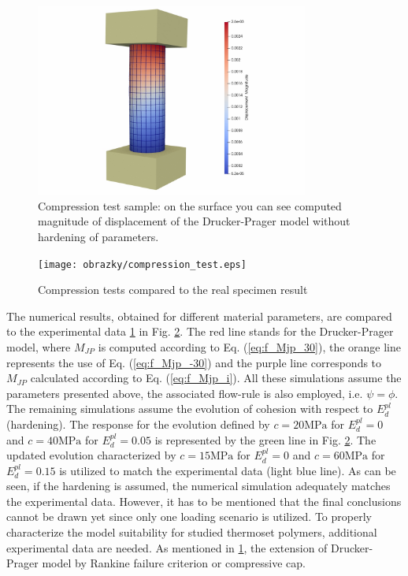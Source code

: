 \begin{figure}[h!]
	\centering
	\includegraphics[width=0.8\textwidth]{obrazky/compression_displacement_magnitude.jpg}
	\caption[Compression test sample]{Compression test sample: on the surface you can see computed magnitude of displacement of the Drucker-Prager model without hardening of parameters.}\label{obr:Compresion_test}
\end{figure}


\begin{figure}[h!]
	\centering
	\texttt{[image: obrazky/compression\_test.eps]}
	\caption[Compresion tests]{Compression tests compared to the real specimen result \cite{Deuch_phd_thesis}}\label{obr:Compresion_2d}
\end{figure}

The numerical results, obtained for different material parameters, are compared to the experimental data \ref{obr:Compresion_test} in Fig. \ref{obr:Compresion_2d}. The red line stands for the Drucker-Prager model, where $M_{JP}$ is computed according to Eq. (\ref{eq:f_Mjp_30}), the orange line represents the use of Eq. (\ref{eq:f_Mjp_-30}) and the purple line corresponds to $M_{JP}$ calculated according to Eq. (\ref{eq:f_Mjp_i}). All these simulations assume the parameters presented above, the associated flow-rule is also employed, i.e. $\psi=\phi$. The remaining simulations assume the evolution of cohesion with respect to $E_d^{pl}$ (hardening). The response for the evolution defined by $c=20\mathrm{MPa}$ for $E_d^{pl}=0$ and $c=40\mathrm{MPa}$ for $E_d^{pl}=0.05$ is represented by the green line in Fig. \ref{obr:Compresion_2d}. The updated evolution characterized by $c=15\mathrm{MPa}$ for $E_d^{pl}=0$ and $c=60\mathrm{MPa}$ for $E_d^{pl}=0.15$ is utilized to match the experimental data (light blue line). As can be seen, if the hardening is assumed, the numerical simulation adequately matches the experimental data. However, it has to be mentioned that the final conclusions cannot be drawn yet since only one loading scenario is utilized. To properly characterize the model suitability for studied thermoset polymers, additional experimental data are needed.  As mentioned in \ref{obr:Compresion_test}, the extension of Drucker-Prager model by Rankine failure criterion or compressive cap. 

